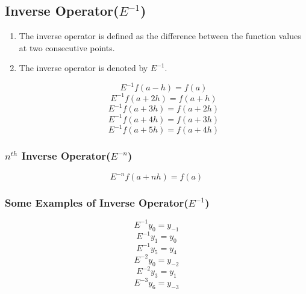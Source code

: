 \subsection{Inverse Operator($E^{-1}$)}

\begin{enumerate}
  \item The inverse operator is defined as the difference between the function values at two consecutive points.
  \item The inverse operator is denoted by $E^{-1}$.


  \[E^{-1} f(a - h) = f(a) \]
  \[E^{-1} f(a + 2h) = f(a + h) \]
  \[E^{-1} f(a + 3h) = f(a + 2h) \]
  \[E^{-1} f(a + 4h) = f(a + 3h) \]
  \[E^{-1} f(a + 5h) = f(a + 4h) \]


  
\end{enumerate}

\subsubsection{$n^{th}$ Inverse Operator($E^{-n}$)}

\[E^{-n} f(a + nh) = f(a)\]


\subsubsection{Some Examples of Inverse Operator($E^{-1}$)}

\[E^{-1} y_0 = {y}_{-1}\]
\[E^{-1} y_1 = y_0\]
\[E^{-1} y_5 = y_4\]
\[E^{-2} y_0 = {y}_{-2}\]
\[E^{-2} y_3 = y_1\]
\[E^{-3} y_6 = {y}_{-3}\]